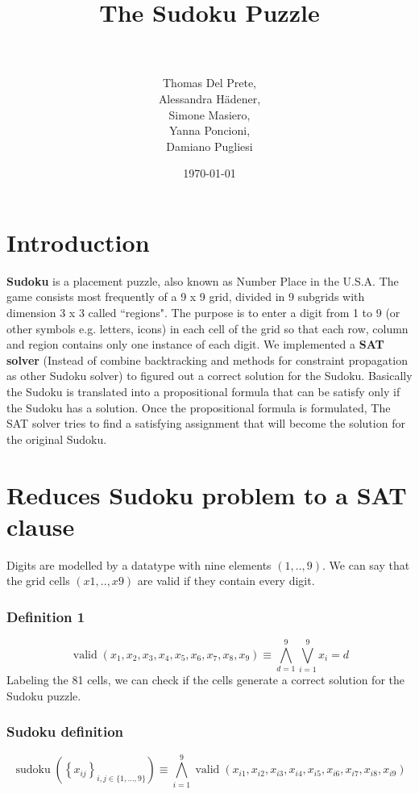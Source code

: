 \documentclass[paper=a4, fontsize=14pt]{scrartcl} %
\title{	
\huge The Sudoku Puzzle \\ %
\horrule{0.5pt} \\[0.5cm] %
}
\author{Thomas Del Prete, \\
		Alessandra H{\" a}dener, \\
		Simone Masiero, \\
		Yanna Poncioni, \\
		Damiano Pugliesi} %
\date{\normalsize\today} %
\begin{document}
	
	\maketitle
	
	\section*{Introduction}
	
		\textbf{Sudoku} is a placement puzzle, also known as Number Place in the U.S.A.
		\newline
		The game consists most frequently of a 9 x 9 grid, divided in 9 subgrids with dimension 3 x 3 called ``regions".
		\newline
		The purpose is to enter a digit from 1 to 9 (or other symbols e.g. letters, icons) in each cell of the grid so that each row, column and region contains only one instance of each digit.
		\newline
		We implemented a \textbf{SAT solver} (Instead of combine backtracking and methods for constraint propagation as other Sudoku solver) to figured out a correct solution for the Sudoku.
		\newline
		Basically the Sudoku is translated into a propositional formula that can be satisfy only if the Sudoku has a solution.
		\newline
		Once the propositional formula is formulated, The SAT solver tries to find a satisfying assignment that will become the solution for the original Sudoku.
			 			
	\section*{Reduces Sudoku problem to a SAT clause}
	
	
	Digits are modelled by a datatype with nine elements $(1, . . , 9)$.
	\newline
	We can say that the grid cells $(x1, . . , x9)$ are valid if they contain
	every digit.
	\subsubsection*{Definition 1}
		\[ \operatorname{valid}\left(x_{1}, x_{2}, x_{3}, x_{4}, x_{5}, x_{6}, x_{7}, x_{8}, x_{9}\right) \equiv \bigwedge_{d=1}^{9} \bigvee_{i=1}^{9} x_{i}=d \]
	Labeling the 81 cells, we can check if the cells generate a correct solution for the Sudoku puzzle.
	
	\subsubsection*{Sudoku definition}
	\[\operatorname{sudoku}\left(\left\{x_{i j}\right\}_{i, j \in\{1, \ldots, 9\}}\right) \equiv \bigwedge_{i=1}^{9} \operatorname{valid}\left(x_{i 1}, x_{i 2}, x_{i 3}, x_{i 4}, x_{i 5}, x_{i 6}, x_{i 7}, x_{i 8}, x_{i 9}\right)\]
	
\end{document}
